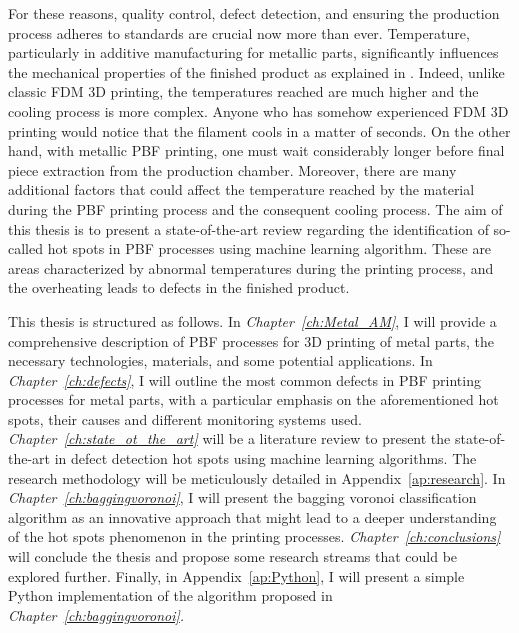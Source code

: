 For these reasons, quality control, defect detection, and ensuring the production process adheres to standards are crucial now more than ever. Temperature, particularly in additive manufacturing for metallic parts, significantly influences the mechanical properties of the finished product as explained in \citeauthor{williams_situ_2019}. Indeed, unlike classic FDM 3D printing, the temperatures reached are much higher and the cooling process is more complex. Anyone who has somehow experienced FDM 3D printing would notice that the filament cools in a matter of seconds. On the other hand, with metallic PBF printing, one must wait considerably longer before final piece extraction from the production chamber. Moreover, there are many additional factors that could affect the temperature reached by the material during the PBF printing process and the consequent cooling process.
The aim of this thesis is to present a state-of-the-art review regarding the identification of so-called hot spots in PBF processes using machine learning algorithm. These are areas characterized by abnormal temperatures during the printing process, and the overheating leads to defects in the finished product.

This thesis is structured as follows. In \emph{Chapter~\ref{ch:Metal_AM}}, I will provide a comprehensive description of PBF processes for 3D printing of metal parts, the necessary technologies, materials, and some potential applications. In \emph{Chapter~\ref{ch:defects}}, I will outline the most common defects in PBF printing processes for metal parts, with a particular emphasis on the aforementioned hot spots, their causes and different monitoring systems used. \emph{Chapter~\ref{ch:state_ot_the_art}} will be a literature review to present the state-of-the-art in defect detection hot spots using machine learning algorithms. The research methodology will be meticulously detailed in Appendix~\ref{ap:research}. In \emph{Chapter~\ref{ch:baggingvoronoi}}, I will present the bagging voronoi classification algorithm as an innovative approach that might lead to a deeper understanding of the hot spots phenomenon in the printing processes. \emph{Chapter~\ref{ch:conclusions}} will conclude the thesis and propose some research streams that could be explored further. Finally, in Appendix~\ref{ap:Python}, I will present a simple Python \cite{python_software_foundation_python_2023} implementation of the algorithm proposed in \emph{Chapter~\ref{ch:baggingvoronoi}.}